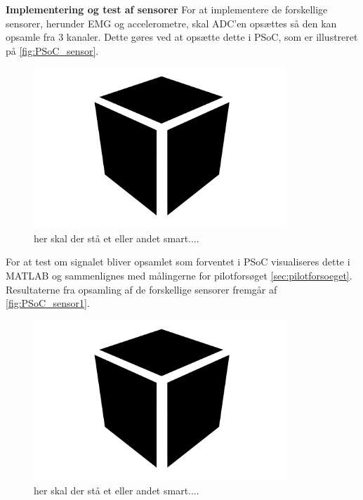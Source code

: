 \textbf{Implementering og test af sensorer}
For at implementere de forskellige sensorer, herunder EMG og accelerometre, skal ADC'en opsættes så den kan opsamle fra 3 kanaler. Dette gøres ved at opsætte dette i PSoC, som er illustreret på \autoref{fig:PSoC_sensor}.

\begin{figure}[H]
\centering
\includegraphics[width=0.85\textwidth]{figures/blackbox}
\caption{her skal der stå et eller andet smart....}
\label{fig:PSoC_sensor}
\end{figure}

For at test om signalet bliver opsamlet som forventet i PSoC visualiseres dette i MATLAB og sammenlignes med målingerne for pilotforsøget \autoref{sec:pilotforsoeget}. Resultaterne fra opsamling af de forskellige sensorer fremgår af \autoref{fig:PSoC_sensor1}.

\begin{figure}[H]
\centering
\includegraphics[width=0.85\textwidth]{figures/blackbox}
\caption{her skal der stå et eller andet smart....}
\label{fig:PSoC_sensor1}
\end{figure}